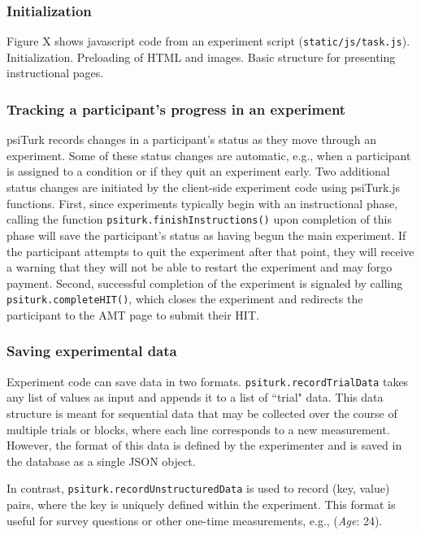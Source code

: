 \documentclass[twocolumn]{svjour3}          %
\begin{document}
\subsubsection{Initialization}

Figure X shows javascript code from an experiment script (\texttt{static/js/task.js}). 
Initialization. 
Preloading of HTML and images.
Basic structure for presenting instructional pages.

\subsubsection{Tracking a participant's progress in an experiment} 

psiTurk records changes in a participant's status as they move through an experiment. 
Some of these status changes are automatic, e.g., when a participant is assigned to a condition or if they quit an experiment early. 
Two additional status changes are initiated by the client-side experiment code using psiTurk.js functions.
First, since experiments typically begin with an instructional phase, calling the function \texttt{psiturk.finishInstructions()} upon completion of this phase will save the participant's status as having begun the main experiment.
If the participant attempts to quit the experiment after that point, they will receive a warning that they will not be able to restart the experiment and may forgo payment.
Second, successful completion of the experiment is signaled by calling \texttt{psiturk.completeHIT()}, which closes the experiment and redirects the participant to the AMT page to submit their HIT.

\subsubsection{Saving experimental data} 

Experiment code can save data in two formats.
\texttt{psiturk.recordTrialData} takes any list of values as input and appends it to a list of ``trial" data.
This data structure is meant for sequential data that may be collected over the course of multiple trials or blocks, where each line corresponds to a new measurement.
However, the format of this data is defined by the experimenter and is saved in the database as a single JSON object.

In contrast, \texttt{psiturk.recordUnstructuredData} is used to record (key, value) pairs, where the key is uniquely defined within the experiment.
This format is useful for survey questions or other one-time measurements, e.g., (\emph{Age}: 24).
\end{document}
